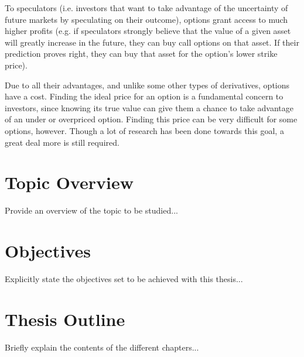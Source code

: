 To speculators (i.e. investors that want to take advantage of the uncertainty of future markets by speculating on their outcome), options grant access to much higher profits (e.g. if speculators strongly believe that the value of a given asset will greatly increase in the future, they can buy call options on that asset. If their prediction proves right, they can buy that asset for the option's lower strike price).

Due to all their advantages, and unlike some other types of derivatives, options have a cost. Finding the ideal price for an option is a fundamental concern to investors, since knowing its true value can give them a chance to take advantage of an under or overpriced option.
Finding this price can be very difficult for some options, however. Though a lot of research has been done towards this goal, a great deal more is still required.


\section{Topic Overview}
\label{section:overview}

Provide an overview of the topic to be studied...


\section{Objectives}
\label{section:objectives}

Explicitly state the objectives set to be achieved with this thesis...


\section{Thesis Outline}
\label{section:outline}

Briefly explain the contents of the different chapters...

